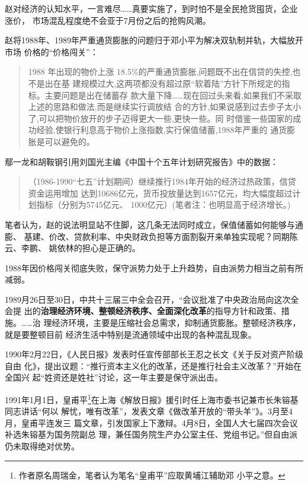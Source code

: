 赵对经济的认知水平，一言难尽……真要实施了，到时怕不是全民抢货囤货，企业涨价，
市场混乱程度绝不会亚于7月份之后的抢购风潮。

赵将1988年、1989年严重通货膨胀的问题归于邓小平为解决双轨制并轨，大幅放开市场
价格的“价格闯关”：
\begin{quotation}
  1988 年出现的物价上涨 18.5\%的严重通货膨胀,问题既不出在信贷的失控,也不是出在基
  建规模过大,这两项都没有超过原“软着陆”方针下所规定的指标。主要问题是出在储蓄存
  款大量下降……现在回过头来看,如果我们不采取上述的思路和做法,而是继续实行调放结
  合的方针,如果说感到过去步子太小了,可以把物价放开的步子迈得更大一些,更快一些。同
  时借鉴一些国家的成功经验,使银行利息高于物价上涨指数,实行保值储蓄,1988年严重的
  通货膨胀是可以避免的。
\end{quotation}

鄢一龙和胡鞍钢引用刘国光主编《中国十个五年计划研究报告》中的数据：
\begin{quotation}
（1986-1990“七五”计划期间）继续推行1984年开始的经济过热政策，信贷资金运用增加
达到10686亿元，货币投放量达到1657亿元，均大幅度超过计划指标（分别为5745亿元、
1000亿元）(笔者注：也明显高于经济增长。)\cite{shiyiwu}
\end{quotation}

笔者认为，赵的说法明显站不住脚，这几条无法同时成立，保值储蓄如何能够与通膨、
基建、价改、贷款利率、中央财政负担等方面割裂开来单独实现呢？同期陈云、李鹏、
姚依林的担心是正确的。

1988年因价格闯关彻底失败，保守派势力处于上升趋势，自由派势力相当之前有所减弱。

1989月26日至30日，中共十三届三中全会召开，“会议批准了中央政治局向这次全会提
出的\textbf{治理经济环境、整顿经济秩序、全面深化改革}的指导方针和政策、措施。……治
理经济环境，主要是压缩社会总需求，抑制通货膨胀。整顿经济秩序，就是要整顿目前
经济生活中特别是流通领域中出现的各种混乱现象。

1990年2月22日，《人民日报》发表时任宣传部部长王忍之长文《关于反对资产阶级自由
化》，提出议题：“推行资本主义化的改革，还是推行社会主义改革？”开始在全国兴
起“姓资还是姓社”讨论，这一年主要是保守派出击。

1991年1月1日，皇甫平\footnote{作者原名周瑞金，笔者认为笔名“皇甫平”应取黄埔江辅助邓
  小平之意。}在上海《解放日报》援引时任上海市委书记兼市长朱镕基同志讲话“何以
解忧，唯有改革”，发表文章《做改革开放的“带头羊”》。3月至4月，皇甫平连发三
篇文章，引发国家上下激辩。4月8日，全国人大七届四次会议补选朱镕基为国务院副总
理，兼任国务院生产办公室主任、党组书记。”但自由派仍未取得绝对优势。

